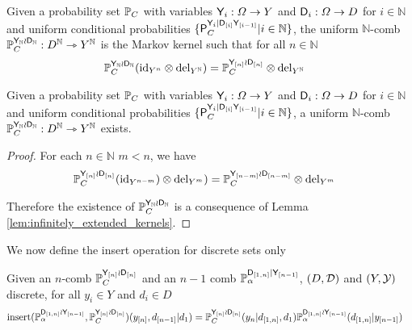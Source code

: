 \begin{definition}
Given a probability set $\mathbb{P}_C$ with variables $\mathsf{Y}_i:\Omega\to Y$ and $\mathsf{D}_i:\Omega\to D$ for $i\in \mathbb{N}$ and uniform conditional probabilities $\{\mathsf{P}_C^{\mathsf{Y}_i|\mathsf{D}_{[i]}\mathsf{Y}_{[i-1]}}|i\in \mathbb{N}\}$, the uniform $\mathbb{N}$-comb $\mathbb{P}_C^{\mathsf{Y}_{\mathbb{N}}\wr \mathsf{D}_{\mathbb{N}}}:D^\mathbb{N}\rightarrowtriangle Y^\mathbb{N}$ is the Markov kernel such that for all $n\in \mathbb{N}$
\begin{align}
    \mathbb{P}_C^{\mathsf{Y}_{\mathbb{N}}\wr \mathsf{D}_{\mathbb{N}}}(\mathrm{id}_{Y^{n}}\otimes \mathrm{del}_{Y^{\mathbb{N}}}) &= \mathbb{P}_C^{\mathsf{Y}_{[n]}\wr \mathsf{D}_{[n]}}\otimes \mathrm{del}_{Y^{\mathbb{N}}}
\end{align}
\end{definition}

\begin{theorem}
Given a probability set $\mathbb{P}_C$ with variables $\mathsf{Y}_i:\Omega\to Y$ and $\mathsf{D}_i:\Omega\to D$ for $i\in \mathbb{N}$ and uniform conditional probabilities $\{\mathsf{P}_C^{\mathsf{Y}_i|\mathsf{D}_{[i]}\mathsf{Y}_{[i-1]}}|i\in \mathbb{N}\}$, a uniform $\mathbb{N}$-comb $\mathbb{P}_C^{\mathsf{Y}_{\mathbb{N}}\wr \mathsf{D}_{\mathbb{N}}}:D^\mathbb{N}\rightarrowtriangle Y^\mathbb{N}$ exists.
\end{theorem}

\begin{proof}
For each $n\in \mathbb{N}$ $m<n$, we have
\begin{align}
    \mathbb{P}_C^{\mathsf{Y}_{[n]}\wr \mathsf{D}_{[n]}}(\mathrm{id}_{Y^{n-m}})\otimes \mathrm{del}_{Y^m}) &= \mathbb{P}_C^{\mathsf{Y}_{[n-m]}\wr \mathsf{D}_{[n-m]}}\otimes \mathrm{del}_{Y^m}
\end{align}

Therefore the existence of $\mathbb{P}_C^{\mathsf{Y}_{\mathbb{N}}\wr \mathsf{D}_{\mathbb{N}}}$ is a consequence of Lemma \ref{lem:infinitely_extended_kernels}.
\end{proof}

We now define the insert operation for discrete sets only

\begin{definition}
Given an $n$-comb $\mathbb{P}_C^{\mathsf{Y}_{[n]}\wr \mathsf{D}_{[n]}}$ and an $n-1$ comb $\mathbb{P}_\alpha^{\mathsf{D}_{[1,n]}|\mathsf{Y}_{[n-1]}}$, $(D,\mathcal{D})$ and $(Y,\mathcal{Y})$ discrete, for all $y_i\in Y$ and $d_i\in D$
\begin{align}
    \mathrm{insert}(\mathbb{P}_\alpha^{\mathsf{D}_{[1,n]}\wr \mathsf{Y}_{[n-1]}},\mathbb{P}_C^{\mathsf{Y}_{[n]}\wr \mathsf{D}_{[n]}})(y_{[n]},d_{[n-1]}|d_1) &= \mathbb{P}_C^{\mathsf{Y}_{[n]}\wr \mathsf{D}_{[n]}}(y_n|d_{[1,n]},d_1)\mathbb{P}_\alpha^{\mathsf{D}_{[1,n]}\wr\mathsf{Y}_{[n-1]}}(d_{[1,n]}|y_{[n-1]})
\end{align}
\end{definition}

